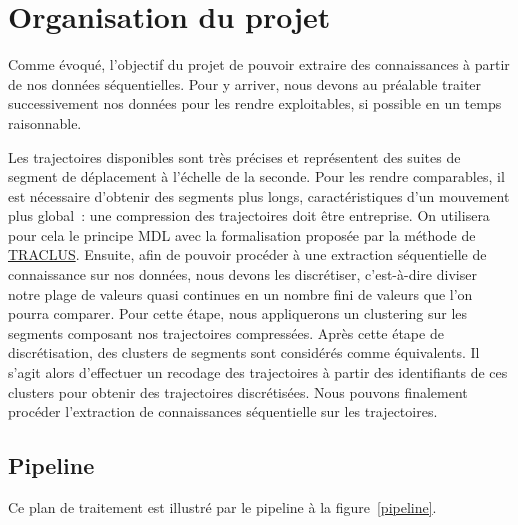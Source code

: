 \setlength{\columnsep}{0.6cm}

\chapter{Organisation du projet} %

Comme évoqué, l'objectif du projet de pouvoir extraire des connaissances à partir de nos données séquentielles. Pour y arriver, nous devons au préalable traiter successivement nos données pour les rendre exploitables, si possible en un temps raisonnable. 

Les trajectoires disponibles sont très précises et représentent des suites de segment de déplacement à l'échelle de la seconde. Pour les rendre comparables, il est nécessaire d'obtenir des segments plus longs, caractéristiques d'un mouvement plus global~:  
une compression des trajectoires doit être entreprise. On utilisera pour cela le principe MDL avec la formalisation proposée par la méthode de \href{https://hanj.cs.illinois.edu/pdf/sigmod07_jglee.pdf}{TRACLUS}. Ensuite, afin de pouvoir procéder à une extraction séquentielle de connaissance sur nos données, nous devons les discrétiser, c'est-à-dire diviser notre plage de valeurs quasi continues en un nombre fini de valeurs que l'on pourra comparer. Pour cette étape, nous appliquerons un clustering sur les segments composant nos trajectoires compressées. Après cette étape de discrétisation, des clusters de segments sont considérés comme équivalents. Il s'agit alors d'effectuer un recodage des trajectoires à partir des identifiants de ces clusters pour obtenir des trajectoires discrétisées. Nous pouvons finalement procéder l'extraction  de connaissances séquentielle sur les trajectoires. 



\section{Pipeline}

Ce plan de traitement est illustré par le pipeline à la figure~\ref{pipeline}.


